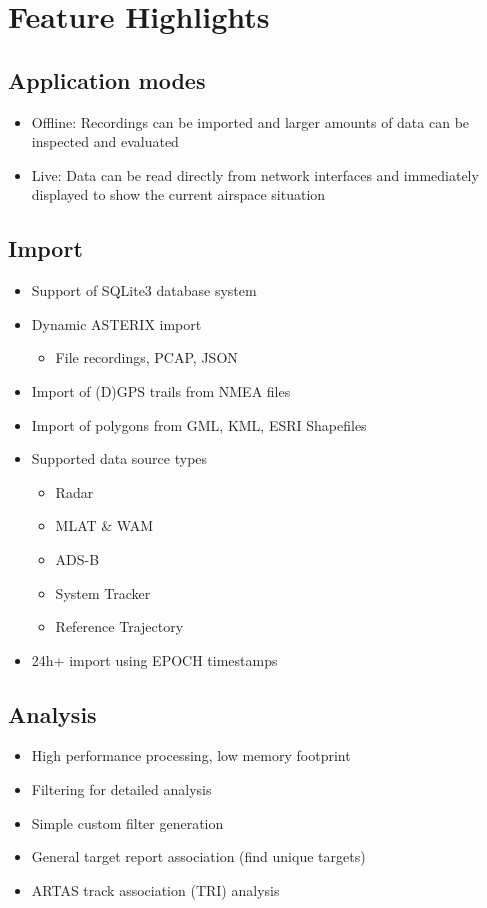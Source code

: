 \section{Feature Highlights}

\subsection{Application modes}
\begin{itemize} 
    \item Offline: Recordings can be imported and larger amounts of data can be inspected and evaluated
    \item Live: Data can be read directly from network interfaces and immediately displayed to show the current airspace situation
\end{itemize}

\subsection{Import}
\begin{itemize}  
    \item Support of SQLite3 database system
    \item Dynamic ASTERIX import
    \begin{itemize}  
        \item File recordings, PCAP, JSON
    \end{itemize}    
    \item Import of (D)GPS trails from NMEA files
    \item Import of polygons from GML, KML, ESRI Shapefiles
    \item Supported data source types
    \begin{itemize}  
        \item Radar
        \item MLAT \& WAM
        \item ADS-B
        \item System Tracker
        \item Reference Trajectory
    \end{itemize}
    \item 24h+ import using EPOCH timestamps    
\end{itemize}

\subsection{Analysis}
\begin{itemize}  
    \item High performance processing, low memory footprint
    \item Filtering for detailed analysis
    \item Simple custom filter generation
    \item General target report association (find unique targets)
    \item ARTAS track association (TRI) analysis
\end{itemize}

